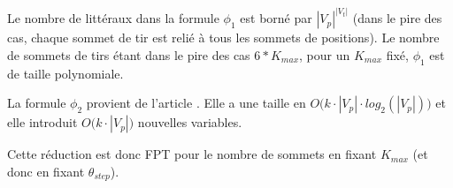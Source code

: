 Le nombre de littéraux dans la formule $\phi_1$ est borné par $|V_p| ^{|V_t|}$  (dans le pire des cas, chaque sommet de tir est relié à tous les sommets de positions). Le nombre de sommets de tirs étant dans le pire des cas $6*K_{max}$, pour un $K_{max}$ fixé, $\phi_1$ est de taille polynomiale. \newline

La formule $\phi_2$ provient de l'article \cite{FG10}. Elle a une taille en $O\Big(k\cdot |V_p| \cdot log_2(|V_p|)\Big)$ et elle introduit  $O\Big(k \cdot |V_p| \Big)$ nouvelles variables.

Cette réduction est donc FPT pour le nombre de sommets en fixant $K_{max}$ (et donc en fixant $\theta_{step}$).